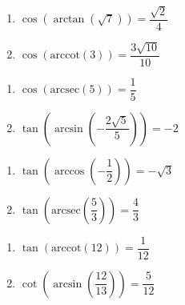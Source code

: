 \begin{multicols}{2}

\begin{enumerate}

\setcounter{enumi}{\value{HW}}

\item  $\cos\left(\arctan\left(\sqrt{7} \right)\right) = \dfrac{\sqrt{2}}{4}$
\item  $\cos\left(\text{arccot}\left( 3 \right)\right) = \dfrac{3\sqrt{10}}{10}$

\setcounter{HW}{\value{enumi}}

\end{enumerate}

\end{multicols}

\begin{multicols}{2}

\begin{enumerate}

\setcounter{enumi}{\value{HW}}

\item  $\cos\left(\text{arcsec}\left( 5 \right)\right) = \dfrac{1}{5}$ 
\item  $\tan\left(\arcsin\left(-\dfrac{2\sqrt{5}}{5}\right)\right)=-2$

\setcounter{HW}{\value{enumi}}

\end{enumerate}

\end{multicols}

\begin{multicols}{2}

\begin{enumerate}

\setcounter{enumi}{\value{HW}}

\item  $\tan\left(\arccos\left(-\dfrac{1}{2}\right)\right) = -\sqrt{3}$
\item  $\tan\left(\text{arcsec}\left(\dfrac{5}{3}\right)\right) = \dfrac{4}{3}$

\setcounter{HW}{\value{enumi}}

\end{enumerate}

\end{multicols}

\begin{multicols}{2}

\begin{enumerate}

\setcounter{enumi}{\value{HW}}

\item  $\tan\left(\text{arccot}\left( 12  \right)\right) = \dfrac{1}{12}$ 
\item  $\cot\left(\arcsin\left(\dfrac{12}{13}\right)\right) = \dfrac{5}{12}$

\setcounter{HW}{\value{enumi}}

\end{enumerate}

\end{multicols}

